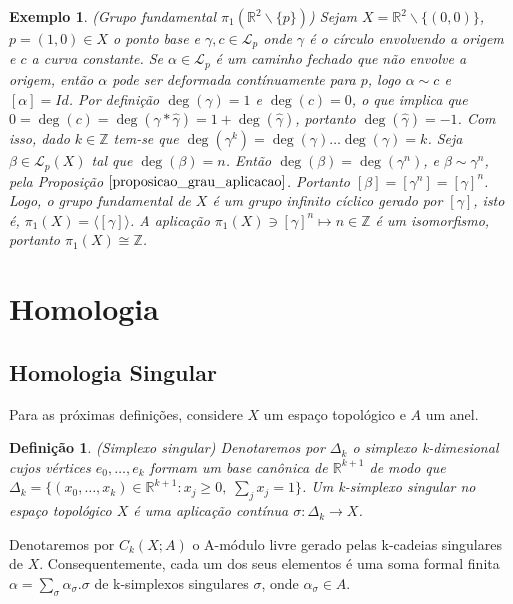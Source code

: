 \documentclass[12pt]{book}
\newtheorem{definicao}[teorema]{Definição}
\newtheorem{exemplo}[teorema]{Exemplo}
\newcommand{\cadeia}[2]{C_{#1}(#2; A)}
\newcommand{\caminhos}{\mathcal{L}}
\newcommand{\caminhospontobase}[1]{\caminhos_{#1}}
\newcommand{\caminhospontobasegeral}[2]{\caminhos_{#1}(#2)}
\newcommand{\classe}[1]{[#1]}
\newcommand{\gerador}[1]{\langle #1\rangle}
\newcommand{\grupofundamental}[1]{\pi_{1}(#1)}
\newcommand{\inteiros}{\mathbb{Z}}
\newcommand{\real}[1]{\mathbb{R}^{#1}}
\begin{document}
	\begin{exemplo}\label{exemplo_grupo_fundamental_plano_furo}
		(Grupo fundamental $\grupofundamental{\real{2}\backslash\{p\}}$) Sejam $X = \real{2}\backslash \{(0,0)\}$, $p=(1,0) \in X$ o ponto base e $\gamma,c \in \caminhospontobase{p}$ onde $\gamma$ é o círculo envolvendo a origem e $c$ a curva constante. Se $\alpha \in \caminhospontobase{p}$ é um caminho fechado que não envolve a origem, então $\alpha$ pode ser deformada contínuamente para $p$, logo $\alpha \sim c$ e $\classe{\alpha} = Id$. Por definição $\deg(\gamma) = 1$ e $\deg(c) =0$, o que implica que $0= \deg(c)=\deg(\gamma*\hat{\gamma} ) = 1 +\deg(\hat{\gamma} )$, portanto $\deg(\hat{\gamma} )=-1$. Com isso, dado $k \in \inteiros$ tem-se que $\deg(\gamma^{k}) = \deg(\gamma)\dots \deg(\gamma) = k$. Seja $\beta \in \caminhospontobasegeral{p}{X}$ tal que $\deg(\beta)=n$. Então $\deg(\beta) = \deg(\gamma^{n})$, e $\beta \sim \gamma^{n}$, pela Proposição $\ref{proposicao_grau_aplicacao}$. Portanto $\classe{\beta} =  \classe{\gamma^{n}}=\classe{\gamma}^{n}$. Logo, o grupo fundamental de $X$ é um grupo infinito cíclico gerado por $\classe{\gamma}$, isto é, $\grupofundamental{X} = \gerador{\classe{\gamma}}$. A aplicação $\grupofundamental{X} \ni \classe{\gamma}^{n} \mapsto n \in \inteiros$ é um isomorfismo, portanto $\grupofundamental{X} \cong \inteiros$.
	\end{exemplo}
		
	\section{Homologia}
	\subsection{Homologia Singular}
	Para as próximas definições, considere $X$ um espaço topológico e $A$ um anel.
	\begin{definicao}
		(Simplexo singular) Denotaremos por $\Delta_{k}$ o simplexo k-dimesional cujos vértices $e_{0}, \dots, e_{k}$ formam um base canônica de $\real{k+1}$ de modo que $\Delta_{k} = \{(x_{0}, \dots, x_{k}) \in \real{k+1}: x_{j}\geq 0, \;\sum_{j}x_{j}=1\}$. Um k-simplexo singular no espaço topológico $X$ é uma aplicação contínua $\sigma:\Delta_{k} \to X$.
	\end{definicao}
	
	Denotaremos por $\cadeia{k}{X}$ o A-módulo livre gerado pelas k-cadeias singulares de $X$. Consequentemente, cada um dos seus elementos é uma soma formal finita $\alpha = \sum_{\sigma} \alpha_{\sigma}.\sigma $ de k-simplexos singulares $\sigma$, onde $\alpha_{\sigma} \in A$.
	
\end{document}
